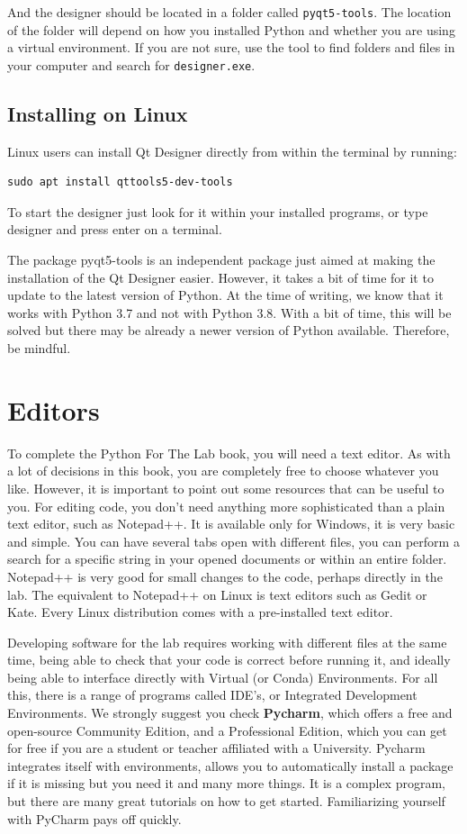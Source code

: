And the designer should be located in a folder called \texttt{pyqt5-tools}. The location of the folder will depend on how you installed Python and whether you are using a virtual environment. If you are not sure, use the tool to find folders and files in your computer and search for \texttt{designer.exe}.

\subsection{Installing on Linux}
Linux users can install Qt Designer directly from within the terminal by running:

\begin{verbatim}
sudo apt install qttools5-dev-tools
\end{verbatim}

To start the designer just look for it within your installed programs, or type designer and press enter on a terminal. 

The package pyqt5-tools is an independent package just aimed at making the installation of the Qt Designer easier. However, it takes a bit of time for it to update to the latest version of Python. At the time of writing, we know that it works with Python 3.7 and not with Python 3.8. With a bit of time, this will be solved but there may be already a newer version of Python available. Therefore, be mindful. 

\section{Editors}
To complete the Python For The Lab book, you will need a text editor. As with a lot of decisions in this book, you are completely free to choose whatever you like. However, it is important to point out some resources that can be useful to you. For editing code, you don’t need anything more sophisticated than a plain text editor, such as Notepad++. It is available only for Windows, it is very basic and simple. You can have several tabs open with different files, you can perform a search for a specific string in your opened documents or within an entire folder. Notepad++ is very good for small changes to the code, perhaps directly in the lab. The equivalent to Notepad++ on Linux is text editors such as Gedit or Kate. Every Linux distribution comes with a pre-installed text editor. 

Developing software for the lab requires working with different files at the same time, being able to check that your code is correct before running it, and ideally being able to interface directly with Virtual (or Conda) Environments. For all this, there is a range of programs called IDE’s, or Integrated Development Environments. We strongly suggest you check \textbf{Pycharm}, which offers a free and open-source Community Edition, and a Professional Edition, which you can get for free if you are a student or teacher affiliated with a University. Pycharm integrates itself with environments, allows you to automatically install a package if it is missing but you need it and many more things. It is a complex program, but there are many great tutorials on how to get started. Familiarizing yourself with PyCharm pays off quickly. 

